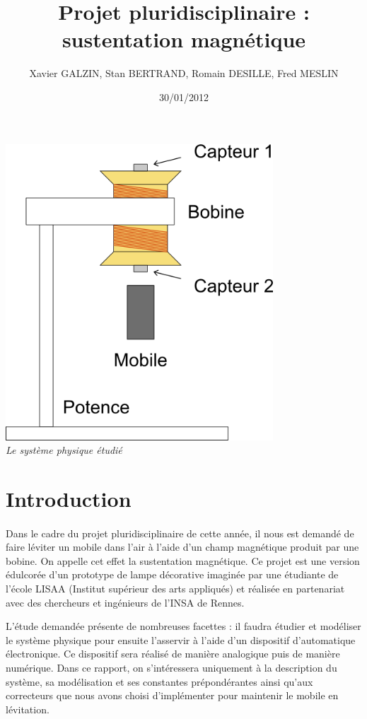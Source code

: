 \documentclass[11pt, french]{article} %
\title{Projet pluridisciplinaire : sustentation magnétique}
\author{ Xavier GALZIN, Stan BERTRAND, Romain DESILLE, Fred MESLIN}
\date{30/01/2012}
\begin{document}
\maketitle

\begin{center}
	\vspace{0.6in}
	\includegraphics[width=10cm]{Automatique/system_physique.png} 
	\\
	\emph{Le système physique étudié}
\end{center}

\pagebreak

\section{Introduction}
\paragraph{}
	Dans le cadre du projet pluridisciplinaire de cette année, il nous est demandé de faire léviter un mobile dans l'air à l'aide d'un champ magnétique produit par une bobine. On appelle cet effet la sustentation magnétique. Ce projet est une version édulcorée d'un prototype de lampe décorative imaginée par une étudiante de l'école LISAA (Institut supérieur des arts appliqués) et réalisée en partenariat avec des chercheurs et ingénieurs de l'INSA de Rennes.

L'étude demandée présente de nombreuses facettes : il faudra étudier et modéliser le système physique pour ensuite l'asservir à l'aide d'un dispositif d'automatique électronique. Ce dispositif sera réalisé de manière analogique puis de manière numérique. Dans ce rapport, on s'intéressera uniquement à la description du système, sa modélisation et ses constantes prépondérantes ainsi qu'aux correcteurs que nous avons choisi d'implémenter pour maintenir le mobile en lévitation.
\end{document}
